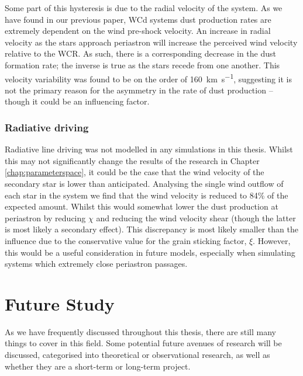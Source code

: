 Some part of this hysteresis is due to the radial velocity of the system.
As we have found in our previous paper, WCd systems dust production rates are extremely dependent on the wind pre-shock velocity.
An increase in radial velocity as the stars approach periastron will increase the perceived wind velocity relative to the WCR.
As such, there is a corresponding decrease in the dust formation rate; the inverse is true as the stars recede from one another.
This velocity variability was found to be on the order of \SI{160}{km.s^{-1}}, suggesting it is not the primary reason for the asymmetry in the rate of dust production -- though it could be an influencing factor.


\subsubsection{Radiative driving}

Radiative line driving was not modelled in any simulations in this thesis.
Whilst this may not significantly change the results of the research in Chapter \ref{chap:parameterspace}, it could be the case that the wind velocity of the secondary star is lower than anticipated.
Analysing the single wind outflow of each star in the system we find that the wind velocity is reduced to 84\% of the expected amount.
Whilst this would somewhat lower the dust production at periastron by reducing $\chi$ and reducing the wind velocity shear (though the latter is most likely a secondary effect).
This discrepancy is most likely smaller than the influence due to the conservative value for the grain sticking factor, $\xi$.
However, this would be a useful consideration in future models, especially when simulating systems which extremely close periastron passages.

\section{Future Study}

As we have frequently discussed throughout this thesis, there are still many things to cover in this field.
Some potential future avenues of research will be discussed, categorised into theoretical or observational research, as well as whether they are a short-term or long-term project.

